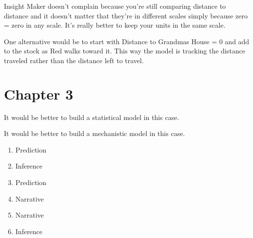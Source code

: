 \documentclass[]{memoir}
\begin{document}
Insight Maker doesn't complain because you're still comparing distance
to distance and it doesn't matter that they're in different scales
simply because zero = zero in any scale. It's really better to keep your
units in the same scale.


One alternative would be to start with Distance to Grandmas House = 0
and add to the stock as Red walks toward it. This way the model is
tracking the distance traveled rather than the distance left to travel.

\section{Chapter 3}


It would be better to build a statistical model in this case.


It would be better to build a mechanistic model in this case.


\begin{enumerate}
\def\labelenumi{\arabic{enumi}.}
\itemsep1pt\parskip0pt
\item
  Prediction
\item
  Inference
\item
  Prediction
\item
  Narrative
\item
  Narrative
\item
  Inference
\end{enumerate}
\end{document}
